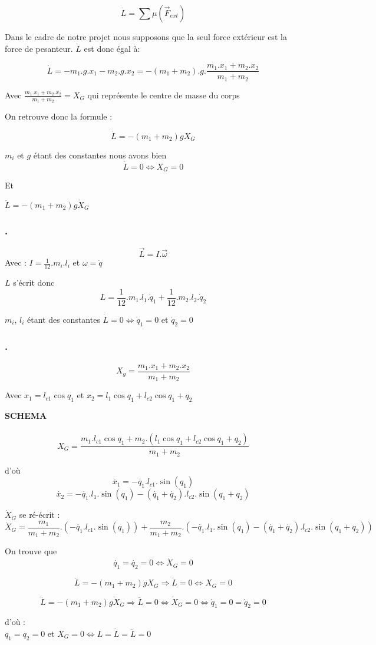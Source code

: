 \documentclass[a4paper,12pt]{report}
\begin{document}
$$\dot{L} = \sum{}{\mu(\overrightarrow{F}_{ext})} $$

Dans le cadre de notre  projet nous supposons que la seul force extérieur est la force de pesanteur.
$\dot{L}$ est donc égal à:

$$\dot{L} = -m_1.g.x_1 - m_2.g.x_2 = - (m_1 + m_2).g.\frac{m_1.x_1 + m_2.x_2}{m_1 + m_2}$$

Avec $\frac{m_1.x_1 + m_2.x_2}{m_1 + m_2} = X_G$ qui représente le centre de masse du corps

On retrouve donc la formule :

$$\dot{L} = - (m_1 + m_2)g X_G$$

$m_i$ et $g$ étant des constantes nous avons bien
$$\dot{L} = 0 \Leftrightarrow X_G = 0$$

Et

$\ddot{L} = - (m_1 + m_2)g \dot{X}_G$



\subsubsection{.}
\label{subs:}

$$\overrightarrow{L} = I.\overrightarrow{\omega}$$
Avec : $I = \frac{1}{12}.m_i.l_i$ et $\omega = \dot{q}$

$L$ s'écrit donc
$$L = \frac{1}{12}.m_1.l_1.\dot{q}_1 + \frac{1}{12}.m_2.l_2.\dot{q}_2$$

$m_i$, $l_i$ étant des constantes $\dot{L} = 0 \Leftrightarrow \dot{q}_1 = 0$ et $\dot{q}_2 = 0$


\subsubsection{.}
\label{subs:}

$$X_g = \frac{m_1.x_1 + m_2.x_2}{m_1 + m_2}$$

Avec $x_1 = l_{c1} \cos{q_1}$ et $x_2 = l_{1} \cos{q_1} + l_{c2} \cos{q_1 + q_2}$

\textbf{SCHEMA}\\\\

$$X_G = \frac{m_1.l_{c1} \cos{q_1} + m_2.(l_{1} \cos{q_1} + l_{c2} \cos{q_1 + q_2})}{m_1 + m_2}$$

d'où
$$
\dot{x_1} = - \dot{q_1}.l_{c1}.\sin(q_1)
$$
$$
\dot{x_2} = - \dot{q_1}.l_{1}.\sin(q_1) - (\dot{q_1} + \dot{q_2}).l_{c2}.\sin(q_1 + q_2)
$$

$\dot{X}_G$ se ré-écrit :
$$\dot{X}_G = \frac{m_1}{m_1 + m_2}.(- \dot{q_1}.l_{c1}.\sin(q_1)) + \frac{m_2}{m_1 + m_2}.(- \dot{q_1}.l_{1}.\sin(q_1) - (\dot{q_1} + \dot{q_2}).l_{c2}.\sin(q_1 + q_2))$$

On trouve que
$$\dot{q_1} = \dot{q_2} = 0 \Leftrightarrow \dot{X}_G = 0$$

$$
\dot{L} = - (m_1 + m_2)g X_G \Rightarrow \dot{L} = 0 \Leftrightarrow X_G = 0
$$

$$
\ddot{L} = - (m_1 + m_2)g \dot{X}_G \Rightarrow \ddot{L} = 0 \Leftrightarrow \dot{X}_G = 0 \Leftrightarrow \dot{q}_1 = 0 =\dot{q}_2 = 0
$$


d'où : \\
$q_1 = q_2 = 0$ et $X_G = 0 \Leftrightarrow L = \dot{L} = \ddot{L} = 0$
\end{document}

